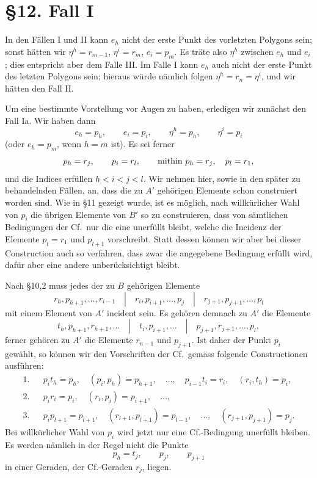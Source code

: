 \documentclass[11pt]{article}
\newcommand{\Cf}{\textup{Cf.}}
\begin{document}
\section*{\S 12. Fall I}
In den Fällen I und II kann $e_h$ nicht der erste Punkt des vorletzten Polygons sein; sonst hätten wir $\eta^h=r_{m-1}$, $\eta^i=r_m$, $e_i=p_m$. Es träte also $\eta^h$ zwischen $e_h$ und $e_i$; dies entspricht aber dem Falle III. Im Falle I kann $e_h$ auch nicht der erste Punkt des letzten Polygons sein; hieraus würde nämlich folgen $\eta^h=r_n=\eta^i$, und wir hätten den Fall II.

Um eine bestimmte Vorstellung vor Augen zu haben, erledigen wir zunächst den Fall Ia. Wir haben dann
\[
e_h=p_h,
\qquad e_i=p_i,
\qquad \eta^h=p_h,
\qquad \eta^i=p_i
\]
(oder $e_h=p_m$, wenn $h=m$ ist). Es sei ferner
\[
p_h=r_j,
\qquad p_i=r_l,
\qquad \hbox{mithin }p_h=r_j,
\quad p_l=r_1,
\]
und die Indices erfüllen $h<i<j<l$. Wir nehmen hier, sowie in den später zu behandelnden Fällen, an, dass die zu $A'$ gehörigen Elemente schon construiert worden sind. Wie in \S 11 gezeigt wurde, ist es möglich, nach willkürlicher Wahl von $p_i$ die übrigen Elemente von $B'$ so zu construieren, dass von sämtlichen Bedingungen der \Cf\ nur die eine unerfüllt bleibt, welche die Incidenz der Elemente $p_l=r_1$ und $p_{l+1}$ vorschreibt. Statt dessen können wir aber bei dieser Construction auch so verfahren, dass zwar die angegebene Bedingung erfüllt wird, dafür aber eine andere unberücksichtigt bleibt.

Nach \S 10,2 muss jedes der zu $B$ gehörigen Elemente
\[
r_h,p_{h+1},\ldots,r_{i-1}
\quad |\quad
r_i,p_{i+1},\ldots,p_j
\quad |\quad
r_{j+1},p_{j+1},\ldots,p_l
\]
mit einem Element von $A'$ incident sein. Es gehören demnach zu $A'$ die Elemente
\[
t_h,p_{h+1},r_{h+1},\ldots
\quad |\quad
t_i,p_{i+1},\ldots
\quad |\quad
p_{j+1},r_{j+1},\ldots,p_l,
\]
ferner gehören zu $A'$ die Elemente $r_{n-1}$ und $p_{j+1}$. Ist daher der Punkt $p_i$ gewählt, so können wir den Vorschriften der \Cf\ gemäss folgende Constructionen ausführen:
\[
\begin{array}{rcl}
1.&&p_i t_h=p_h,
\quad (p_i,p_h)=p_{h+1},
\quad \ldots,
\quad p_{i-1}t_i=r_i,
\quad (r_i,t_h)=p_i,\\
2.&&p_i r_i=p_i,
\quad (r_i,p_i)=p_{i+1},
\quad \ldots,\\
3.&&p_i p_{l+1}=p_{l+1},
\quad (r_{l+1},p_{l+1})=p_{l-1},
\quad \ldots,
\quad (r_{j+1},p_{j+1})=p_j.
\end{array}
\]
Bei willkürlicher Wahl von $p_i$ wird jetzt nur eine \Cf-Bedingung unerfüllt bleiben. Es werden nämlich in der Regel nicht die Punkte
\[
p_h=t_j,
\qquad p_j,
\qquad p_{j+1}
\]
in einer Geraden, der \Cf-Geraden $r_j$, liegen.
\end{document}
